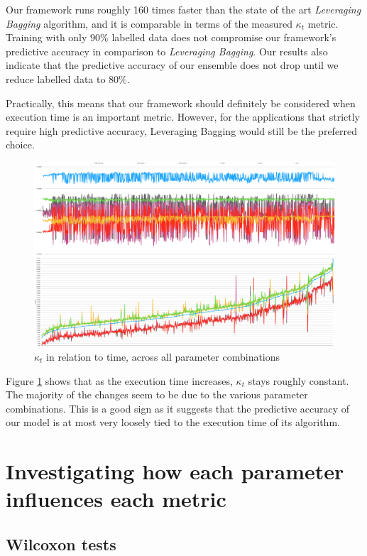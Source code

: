 Our framework runs roughly 160 times faster than the state of the art \textit{Leveraging Bagging} algorithm, and it is comparable in terms of the measured $\kappa_t$ metric. Training with only $90\%$ labelled data does not compromise our framework's predictive accuracy in comparison to \textit{Leveraging Bagging}. Our results also indicate that the predictive accuracy of our ensemble does not drop until we reduce labelled data to 80\%.

Practically, this means that our framework should definitely be considered when execution time is an important metric. However, for the applications that strictly require high predictive accuracy, Leveraging Bagging would still be the preferred choice.

\newpage

\begin{figure}
  \includegraphics[width=\linewidth]{./images/chapter5/kappa_vs_time}
\caption{\label{fig:kappa_vs_time}$\kappa_t$ in relation to time, across all parameter combinations}
\end{figure}
Figure \ref{fig:kappa_vs_time} shows that as the execution time increases, $\kappa_t$ stays roughly constant. The majority of the changes seem to be due to the various parameter combinations. This is a good sign as it suggests that the predictive accuracy of our model is at most very loosely tied to the execution time of its algorithm.

\section{Investigating how each parameter influences each metric}

\subsection{Wilcoxon tests}

